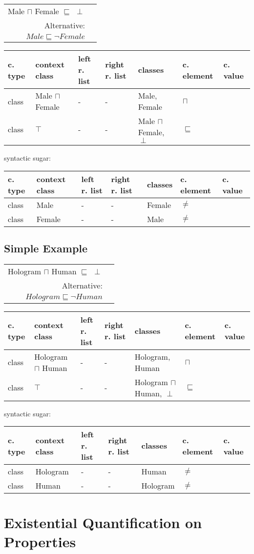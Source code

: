 \documentclass{llncs}
\newenvironment{gcotable}{
  \scriptsize
  \sffamily
  \vspace{0.3cm}
	\begin{center}
  \begin{tabular}{l|l|l|l|l|l|l}
  \hline
  \textbf{c. type} & \textbf{context class} & \textbf{left r. list} & \textbf{right r. list} & \textbf{classes} & \textbf{c. element} & \textbf{c. value} \\
  \hline

}{
  \hline
  \end{tabular}
	\end{center}
}
\newenvironment{DL}{
	\begin{center}
  \begin{tabular}{r l}

}{
  \end{tabular}
	\end{center}
}
\begin{document}
\begin{DL}
Male $\sqcap$ Female $\sqsubseteq$ $\perp$\\
Alternative:\\
$Male \sqsubseteq \neg Female$
\end{DL}

\begin{gcotable}
class & Male $\sqcap$ Female & - & - & Male, Female & $\sqcap$  \\
class & $\top$ & - & - & Male $\sqcap$ Female, $\perp$ & $\sqsubseteq$ \\
\end{gcotable}

syntactic sugar:

\begin{gcotable}
class & Male & - & - & Female & $\ne$ \\
class & Female & - & - & Male & $\ne$ \\
\end{gcotable}

\subsection{Simple Example}

\begin{DL}
Hologram $\sqcap$ Human $\sqsubseteq$ $\perp$\\
Alternative:\\
$Hologram \sqsubseteq \neg Human$
\end{DL}

\begin{gcotable}
class & Hologram $\sqcap$ Human & - & - & Hologram, Human & $\sqcap$  \\
class & $\top$ & - & - & Hologram $\sqcap$ Human, $\perp$ & $\sqsubseteq$ \\
\end{gcotable}

syntactic sugar:

\begin{gcotable}
class & Hologram & - & - & Human & $\ne$ \\
class & Human & - & - & Hologram & $\ne$ \\
\end{gcotable}

\section{Existential Quantification on Properties}
\end{document}
